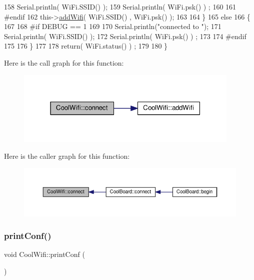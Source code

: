 \begin{DoxyCode}
158             Serial.println( WiFi.SSID() );
159             Serial.println( WiFi.psk() ) ;
160             
161 \textcolor{preprocessor}{        #endif}
162             this->\hyperlink{classCoolWifi_a914d7a1df14dd6b75345fb614c34e9d6}{addWifi}( WiFi.SSID() , WiFi.psk() );
163         
164     \}
165     \textcolor{keywordflow}{else}
166     \{
167 
168 \textcolor{preprocessor}{    #if DEBUG == 1}
169 
170         Serial.println(\textcolor{stringliteral}{"connected to "});
171         Serial.println( WiFi.SSID() );
172         Serial.println( WiFi.psk() ) ;
173                 
174 \textcolor{preprocessor}{    #endif}
175     
176     \}
177     
178     \textcolor{keywordflow}{return}( WiFi.status() ) ;
179 
180 \}
\end{DoxyCode}
Here is the call graph for this function\+:
\nopagebreak
\begin{figure}[H]
\begin{center}
\leavevmode
\includegraphics[width=304pt]{classCoolWifi_ad060353050f40d032a2dbf9e54a768bf_cgraph}
\end{center}
\end{figure}
Here is the caller graph for this function\+:
\nopagebreak
\begin{figure}[H]
\begin{center}
\leavevmode
\includegraphics[width=350pt]{classCoolWifi_ad060353050f40d032a2dbf9e54a768bf_icgraph}
\end{center}
\end{figure}
\mbox{\label{classCoolWifi_a9e6105c6d13d35ec510f6633da9e0223}} 
\subsubsection{\texorpdfstring{print\+Conf()}{printConf()}}
{\footnotesize\ttfamily void Cool\+Wifi\+::print\+Conf (\begin{DoxyParamCaption}{ }\end{DoxyParamCaption})}

